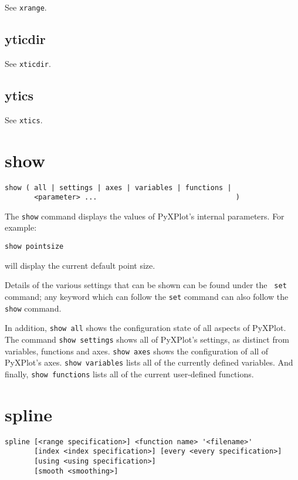 See {\tt xrange}.
   

\subsection{yticdir}

See {\tt xticdir}.


\subsection{ytics}

See {\tt xtics}.

\section{show}

\begin{verbatim}
show ( all | settings | axes | variables | functions |
       <parameter> ...                                 )
\end{verbatim}

The {\tt show} command displays the values of PyXPlot's internal parameters. For
example:

\begin{verbatim}
show pointsize
\end{verbatim}

\noindent will display the current default point size.

Details of the various settings that can be shown can be found under the {\tt
set} command; any keyword which can follow the {\tt set} command can also follow
the {\tt show} command.

In addition, {\tt show all} shows the configuration state of all aspects of
PyXPlot. The command {\tt show settings} shows all of PyXPlot's settings, as
distinct from variables, functions and axes. {\tt show axes} shows the
configuration of all of PyXPlot's axes. {\tt show variables} lists all of the
currently defined variables. And finally, {\tt show functions} lists all of the
current user-defined functions.

\section{spline}

\begin{verbatim}
spline [<range specification>] <function name> '<filename>' 
       [index <index specification>] [every <every specification>]
       [using <using specification>]
       [smooth <smoothing>]
\end{verbatim}

